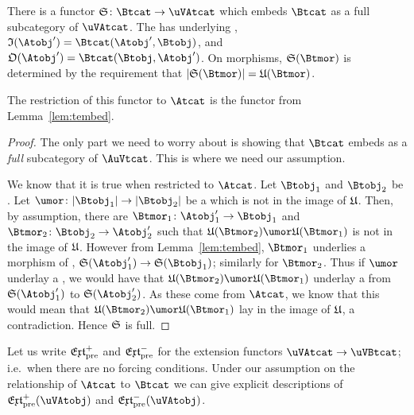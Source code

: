 \documentclass[%
12pt,%
arxiv,%
defaults
]{myclass}
\begin{document}
\begin{lemma}
\label{lem:tembedx}
There is a functor \(\sfunc \colon \Btcat \to \uVAtcat\) which embeds \(\Btcat\) as a full subcategory of \(\uVAtcat\).
The \uVAtobjalt[\sfunc(\Btobj)] has underlying \uobj[\ufunc(\Btobj)],  \itest \(\itest(\Atobj') = \Hom{\Btcat}{\Atobj'}{\Btobj}\), and \otest \(\otest(\Atobj') = \Hom{\Btcat}{\Btobj}{\Atobj'}\).
On morphisms, \(\sfunc(\Btmor)\) is determined by the requirement that \(\forfunc[\sfunc(\Btmor)] = \ufunc(\Btmor)\).

The restriction of this functor to \(\Atcat\) is the functor from Lemma~\ref{lem:tembed}.
\end{lemma}

\begin{proof}
The only part we need to worry about is showing that \(\Btcat\) embeds as a \emph{full} subcategory of \(\AuVtcat\).
This is where we need our assumption.

We know that it is true when restricted to \(\Atcat\).
Let \(\Btobj_1\) and \(\Btobj_2\) be \Btobjalts.
Let \(\umor \colon \forfunc[\Btobj_1] \to \forfunc[\Btobj_2]\) be a \umor which is not in the image of \(\ufunc\).
Then, by assumption, there are \Btmors \(\Btmor_1 \colon \Atobj_1' \to \Btobj_1\) and \(\Btmor_2 \colon \Btobj_2 \to \Atobj_2'\) such that \(\ufunc(\Btmor_2) \umor \ufunc(\Btmor_1)\) is not in the image of \(\ufunc\).
However from Lemma~\ref{lem:tembed}, \(\Btmor_1\) underlies a morphism of \uVBtobjalts, \(\sfunc(\Atobj_1') \to \sfunc(\Btobj_1)\); similarly for \(\Btmor_2\).
Thus if \(\umor\) underlay a \uVBtmor, we would have that \(\ufunc(\Btmor_2)\umor \ufunc(\Btmor_1)\) underlay a \uVBtmor from \(\sfunc(\Atobj_1')\) to \(\sfunc(\Atobj_2')\).
As these come from \(\Atcat\), we know that this would mean that \(\ufunc(\Btmor_2)\umor \ufunc(\Btmor_1)\) lay in the image of \(\ufunc\), a contradiction.
Hence \(\sfunc\) is full.
\end{proof}

Let us write \(\PJextfunc\) and \(\PMextfunc\) for the extension functors \(\uVAtcat \to \uVBtcat\); i.e.\ when there are no forcing conditions.
Under our assumption on the relationship of \(\Atcat\) to \(\Btcat\) we can give explicit descriptions of \(\PJextfunc(\uVAtobj)\) and \(\PMextfunc(\uVAtobj)\).
\end{document}
